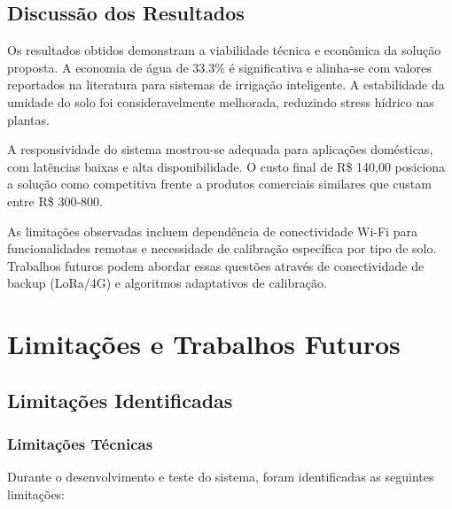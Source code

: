 \documentclass[twoside,english,brazilian]{UNISINOSmonografia}
\begin{document}
\section{Discussão dos Resultados}

Os resultados obtidos demonstram a viabilidade técnica e econômica da solução proposta. A economia de água de 33.3\% é significativa e alinha-se com valores reportados na literatura para sistemas de irrigação inteligente. A estabilidade da umidade do solo foi consideravelmente melhorada, reduzindo stress hídrico nas plantas.

A responsividade do sistema mostrou-se adequada para aplicações domésticas, com latências baixas e alta disponibilidade. O custo final de R\$ 140,00 posiciona a solução como competitiva frente a produtos comerciais similares que custam entre R\$ 300-800.

As limitações observadas incluem dependência de conectividade Wi-Fi para funcionalidades remotas e necessidade de calibração específica por tipo de solo. Trabalhos futuros podem abordar essas questões através de conectividade de backup (LoRa/4G) e algoritmos adaptativos de calibração.


\chapter{Limitações e Trabalhos Futuros}

\section{Limitações Identificadas}

\subsection{Limitações Técnicas}
Durante o desenvolvimento e teste do sistema, foram identificadas as seguintes limitações:
\end{document}
